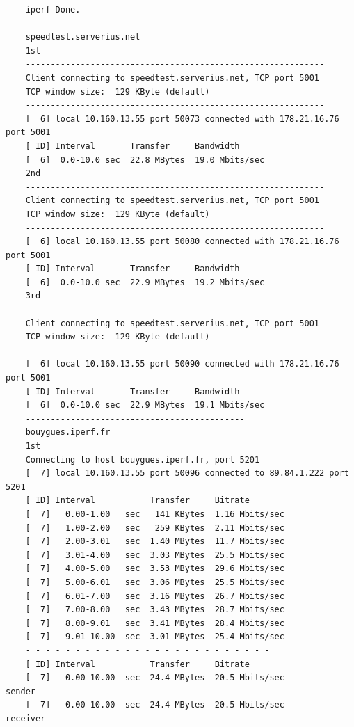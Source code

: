 \documentclass[paper=a4, fontsize=10pt]{scrartcl} %
\numberwithin{equation}{section} %
\numberwithin{figure}{section} %
\numberwithin{table}{section} %
\begin{document}
\begin{lstlisting}
    iperf Done.
    --------------------------------------------
    speedtest.serverius.net
    1st
    ------------------------------------------------------------
    Client connecting to speedtest.serverius.net, TCP port 5001
    TCP window size:  129 KByte (default)
    ------------------------------------------------------------
    [  6] local 10.160.13.55 port 50073 connected with 178.21.16.76 port 5001
    [ ID] Interval       Transfer     Bandwidth
    [  6]  0.0-10.0 sec  22.8 MBytes  19.0 Mbits/sec
    2nd
    ------------------------------------------------------------
    Client connecting to speedtest.serverius.net, TCP port 5001
    TCP window size:  129 KByte (default)
    ------------------------------------------------------------
    [  6] local 10.160.13.55 port 50080 connected with 178.21.16.76 port 5001
    [ ID] Interval       Transfer     Bandwidth
    [  6]  0.0-10.0 sec  22.9 MBytes  19.2 Mbits/sec
    3rd
    ------------------------------------------------------------
    Client connecting to speedtest.serverius.net, TCP port 5001
    TCP window size:  129 KByte (default)
    ------------------------------------------------------------
    [  6] local 10.160.13.55 port 50090 connected with 178.21.16.76 port 5001
    [ ID] Interval       Transfer     Bandwidth
    [  6]  0.0-10.0 sec  22.9 MBytes  19.1 Mbits/sec
    --------------------------------------------
    bouygues.iperf.fr
    1st
    Connecting to host bouygues.iperf.fr, port 5201
    [  7] local 10.160.13.55 port 50096 connected to 89.84.1.222 port 5201
    [ ID] Interval           Transfer     Bitrate
    [  7]   0.00-1.00   sec   141 KBytes  1.16 Mbits/sec                  
    [  7]   1.00-2.00   sec   259 KBytes  2.11 Mbits/sec                  
    [  7]   2.00-3.01   sec  1.40 MBytes  11.7 Mbits/sec                  
    [  7]   3.01-4.00   sec  3.03 MBytes  25.5 Mbits/sec                  
    [  7]   4.00-5.00   sec  3.53 MBytes  29.6 Mbits/sec                  
    [  7]   5.00-6.01   sec  3.06 MBytes  25.5 Mbits/sec                  
    [  7]   6.01-7.00   sec  3.16 MBytes  26.7 Mbits/sec                  
    [  7]   7.00-8.00   sec  3.43 MBytes  28.7 Mbits/sec                  
    [  7]   8.00-9.01   sec  3.41 MBytes  28.4 Mbits/sec                  
    [  7]   9.01-10.00  sec  3.01 MBytes  25.4 Mbits/sec                  
    - - - - - - - - - - - - - - - - - - - - - - - - -
    [ ID] Interval           Transfer     Bitrate
    [  7]   0.00-10.00  sec  24.4 MBytes  20.5 Mbits/sec                  sender
    [  7]   0.00-10.00  sec  24.4 MBytes  20.5 Mbits/sec                  receiver
    

\end{lstlisting}
\end{document}
